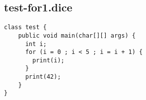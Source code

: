 \subsection{test-for1.dice}
\begin{verbatim}
class test {
	public void main(char[][] args) {
	  int i;
	  for (i = 0 ; i < 5 ; i = i + 1) {
	    print(i);
	  }
	  print(42);
	}
}
\end{verbatim}